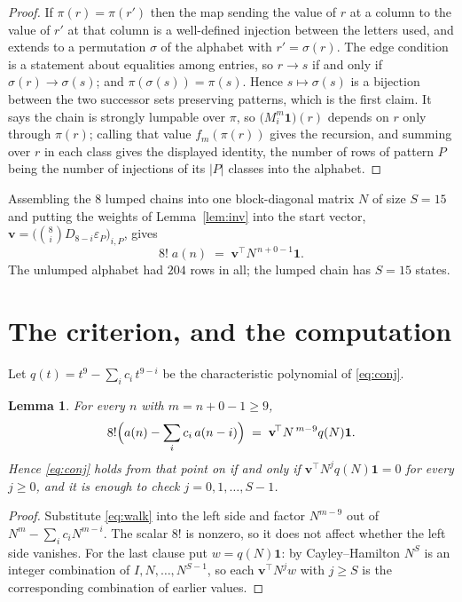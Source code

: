 \documentclass[11pt,a4paper]{article}
\theoremstyle{plain}
\newtheorem{lemma}[theorem]{Lemma}
\theoremstyle{definition}
\begin{document}
\begin{proof}
If $\pi(r)=\pi(r')$ then the map sending the value of $r$ at a column to the value of $r'$
at that column is a well-defined injection between the letters used, and extends to a
permutation $\sigma$ of the alphabet with $r'=\sigma(r)$. The edge condition is a statement
about equalities among entries, so $r\to s$ if and only if $\sigma(r)\to\sigma(s)$; and
$\pi(\sigma(s))=\pi(s)$. Hence $s\mapsto\sigma(s)$ is a bijection between the two successor
sets preserving patterns, which is the first claim. It says the chain is strongly lumpable
over $\pi$, so $\bigl(M_i^{m}\mathbf{1}\bigr)(r)$ depends on $r$ only through $\pi(r)$;
calling that value $f_m(\pi(r))$ gives the recursion, and summing over $r$ in each class
gives the displayed identity, the number of rows of pattern $P$ being the number of
injections of its $|P|$ classes into the alphabet.
\end{proof}

Assembling the $8$ lumped chains into one block-diagonal matrix $N$ of size $S=15$ and
putting the weights of Lemma~\ref{lem:inv} into the start vector,
$\mathbf{v}=\bigl(\binom{8}{i}D_{8-i}\varepsilon_P\bigr)_{i,P}$, gives
\begin{equation}\label{eq:walk}
8!\;a(n)\;=\;\mathbf{v}^{\!\top}N^{\,n+0-1}\mathbf{1} .
\end{equation}
The unlumped alphabet had $204$ rows in all; the lumped chain has $S=15$ states.

\section{The criterion, and the computation}

Let $q(t)=t^{9}-\sum_i c_i\,t^{9-i}$ be the characteristic polynomial of
\eqref{eq:conj}.

\begin{lemma}\label{lem:crit}
For every $n$ with $m=n+0-1\ge9$,
\[
8!\Bigl(a(n)-\sum_i c_i\,a(n-i)\Bigr)\;=\;\mathbf{v}^{\!\top}N^{\,m-9}q(N)\mathbf{1} .
\]
Hence \eqref{eq:conj} holds from that point on if and only if
$\mathbf{v}^{\!\top}N^{j}q(N)\mathbf{1}=0$ for every $j\ge0$, and it is enough to check
$j=0,1,\dots,S-1$.
\end{lemma}

\begin{proof}
Substitute \eqref{eq:walk} into the left side and factor $N^{m-9}$ out of
$N^{m}-\sum_i c_iN^{m-i}$. The scalar $8!$ is nonzero, so it does not affect whether
the left side vanishes. For the last clause put $w=q(N)\mathbf{1}$: by Cayley--Hamilton
$N^{S}$ is an integer combination of $I,N,\dots,N^{S-1}$, so each
$\mathbf{v}^{\!\top}N^{j}w$ with $j\ge S$ is the corresponding combination of earlier
values.
\end{proof}
\end{document}
